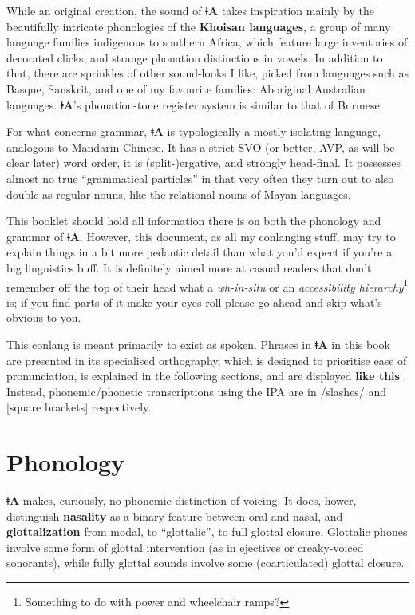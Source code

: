 \documentclass[11pt,a5paper]{book}
\newcommand{\qcn}[1]{\textcolor{AccentText}{\large\textbf{#1}}}
\newcommand{\langname}{\qcn{ǂA}}
\begin{document}
While an original creation, the sound of \langname{} takes inspiration mainly by the beautifully intricate phonologies of the \textbf{Khoisan languages}, a group of many language families indigenous to southern Africa, which feature large inventories of decorated clicks, and strange phonation distinctions in vowels. In addition to that, there are sprinkles of other sound-looks I like, picked from languages such as Basque, Sanskrit, and one of my favourite families: Aboriginal Australian languages. \langname{}'s phonation-tone register system is similar to that of Burmese.

For what concerns grammar, \langname{} is typologically a mostly isolating language, analogous to Mandarin Chinese. It has a strict SVO (or better, AVP, as will be clear later) word order, it is \mbox{(split-)ergative}, and strongly head-final. It possesses almost no true ``grammatical particles'' in that very often they turn out to also double as regular nouns, like the relational nouns of Mayan languages.

This booklet should hold all information there is on both the phonology and grammar of \langname{}. However, this document, as all my conlanging stuff, may try to explain things in a bit more pedantic detail than what you'd expect if you're a big linguistics buff. It is definitely aimed more at casual readers that don't remember off the top of their head what a \emph{wh-in-situ} or an \emph{accessibility hierarchy}\footnote{Something to do with power and wheelchair ramps?} is; if you find parts of it make your eyes roll please go ahead and skip what's obvious to you.

This conlang is meant primarily to exist as spoken. Phrases in \langname{} in this book are presented in its specialised orthography, which is designed to prioritise ease of pronunciation, is explained in the following sections, and are displayed \qcn{like this	}. Instead, phonemic/phonetic transcriptions using the IPA are in /slashes/ and [square brackets] respectively.


\tableofcontents

\chapter{Phonology}

\langname{} makes, curiously, no phonemic distinction of voicing. It does, hower, distinguish \textbf{nasality} as a binary feature between oral and nasal, and \textbf{glottalization} from modal, to ``glottalic'', to full glottal closure. Glot\-talic phones involve some form of glot\-tal in\-ter\-ven\-tion (as in ejec\-tives or crea\-ky-voiced so\-no\-rants), while fully glottal sounds involve some (coarticulated) glottal closure. 
\end{document}
